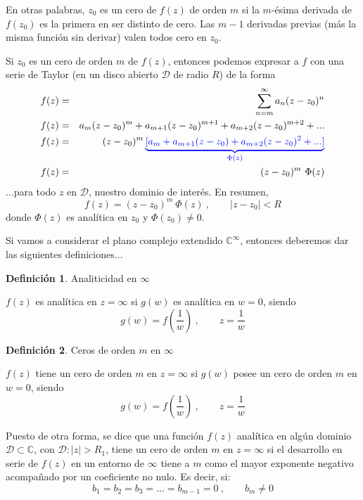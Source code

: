 \documentclass[12pt]{article}
\theoremstyle{definition}
\newtheorem{definition}{Definici\'on}[section]
\theoremstyle{theorem}
\theoremstyle{corolary}
\theoremstyle{method}
\begin{document}
En otras palabras, $z_0$ es un cero de $f(z)$ de orden $m$ si la $m$-\'esima derivada de $f(z_0)$ es la primera en ser distinto de cero. Las $m-1$ derivadas previas (m\'as la misma funci\'on sin derivar) valen todos cero en $z_0$.

Si $z_0$ es un cero de orden $m$ de $f(z)$, entonces podemos expresar a $f$ con una serie de Taylor (en un disco abierto $\mathcal{D}$ de radio $R$) de la forma
\begin{eqnarray*}
f(z)&=&\sum\limits_{n=m}^{\infty}a_n(z-z_0)^n\\
f(z)&=&	a_m(z-z_0)^m+a_{m+1}(z-z_0)^{m+1}+a_{m+2}(z-z_0)^{m+2}+...\\
f(z)&=& (z-z_0)^m \color{blue} \underbrace{[a_m+a_{m+1}(z-z_0)+a_{m+2}(z-z_0)^2+...]}_{\Phi(z)}\\
f(z)&=& (z-z_0)^m\ \Phi(z)
\end{eqnarray*}
...para todo $z$ en $\mathcal{D}$, nuestro dominio de inter\'es. En resumen, $$f(z)= (z-z_0)^m\ \Phi(z)\ ,\qquad |z-z_0|<R$$ donde $\Phi(z)$ es anal\'itica en $z_0$ y $\Phi(z_0)\neq 0$.

Si vamos a considerar el plano complejo extendido $\mathbb{C}^{\infty}$, entonces deberemos dar las siguientes definiciones...

\colorbox{orange!40!white!80}{\parbox{\linewidth}{
\theoremstyle{definition}
\begin{definition}{Analiticidad en $\infty$}

$f(z)$ es anal\'itica en $z=\infty$ si $g(w)$ es anal\'itica en $w=0$, siendo $$g(w)=f\left(\frac{1}{w} \right)\ , \qquad z=\frac{1}{w}$$
\end{definition}}}
\linebreak
\linebreak

\colorbox{orange!40!white!80}{\parbox{\linewidth}{
\theoremstyle{definition}
\begin{definition}{Ceros de orden $m$ en $\infty$}

$f(z)$ tiene un cero de orden $m$ en $z=\infty$ si $g(w)$ posee un cero de orden $m$ en $w=0$, siendo $$g(w)=f\left(\frac{1}{w} \right)\ , \qquad z=\frac{1}{w}$$

Puesto de otra forma, se dice que una funci\'on $f(z)$ anal\'itica en alg\'un dominio $\mathcal{D}\subset \mathbb{C}$, con $\mathcal{D}:|z|>R_1$, tiene un cero de orden $m$ en $z=\infty$ si el desarrollo en serie de $f(z)$ en un entorno de $\infty$ tiene a $m$ como el mayor exponente negativo acompa\~nado por un coeficiente no nulo. Es decir, si: $$b_1=b_2=b_3=...=b_{m-1}=0\ ,\qquad b_m\neq0$$
\end{definition}}}
\linebreak
\linebreak
\end{document}
